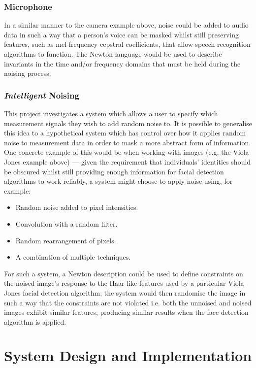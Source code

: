 \documentclass[12pt]{article}
\begin{document}
    \subsubsection{Microphone}
      In a similar manner to the camera example above, noise could be added to audio data in such a way that a person's voice can be masked whilst still preserving features, such as mel-frequency cepstral coefficients, that allow speech recognition algorithms to function. The Newton language would be used to describe invariants in the time and/or frequency domains that must be held during the noising process.

    \subsubsection{\textit{Intelligent} Noising}
      This project investigates a system which allows a user to specify which measurement signals they wish to add random noise to. It is possible to generalise this idea to a hypothetical system which has control over how it applies random noise to measurement data in order to mask a more abstract form of information. One concrete example of this would be when working with images (e.g. the  Viola-Jones example above) --- given the requirement that individuals' identities should be obscured whilst still providing enough information for facial detection algorithms to work reliably, a system might choose to apply noise using, for example:

      \begin{itemize}
        \item Random noise added to pixel intensities.
        \item Convolution with a random filter.
        \item Random rearrangement of pixels.
        \item A combination of multiple techniques.
      \end{itemize}

      For such a system, a Newton description could be used to define constraints on the noised image's response to the Haar-like features used by a particular Viola-Jones facial detection algorithm; the system would then randomise the image in such a way that the constraints are not violated i.e. both the unnoised and noised images exhibit similar features, producing similar results when the face detection algorithm is applied.

\section{System Design and Implementation}
\end{document}
